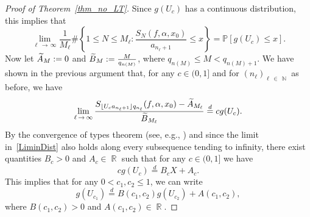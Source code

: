 \documentclass[10pt,a4paper]{amsart}
\numberwithin{equation}{section}
\DeclareMathOperator{\R}{\mathbb{R}}
\DeclareMathOperator{\N}{\mathbb{N}}
\newcommand{\bbP}{\mathbb{P}}
\let\oldtilde\tilde
\renewcommand*{\tilde}[1]{\mathchoice{\widetilde{#1}}{\widetilde{#1}}{\oldtilde{#1}}{\oldtilde{#1}}}
\theoremstyle{definition}
\begin{document}
\begin{proof}[Proof of Theorem~\ref{thm_no_LT}]
Since $g(U_c)$ has a continuous distribution, this implies that
\[
\lim_{\ell\,\rightarrow\,\infty} \frac{1}{M_{\ell}} \# \left \{ 1 \leq N \leq M_{\ell} : \frac{S_N(f, \alpha, x_0)}{a_{n_{\ell}+1}} \leq x \right \} = \bbP \left [g(U_c) \leq x \right].
\]
Now let $ \tilde{A}_M := 0$ and $\tilde{B}_M := \frac{M}{q_{n(M)}}$, where $q_{n(M)} \leq M < q_{n(M) +1}$. We have shown in the previous argument that, for any $c \in (0,1]$ and for $ (n_\ell)_{\ell\,\in\,\N}$ as before, we have
\begin{equation*}
\lim_{\ell\,\to\,\infty} \frac{S_{ \lfloor U_c a_{n_{\ell}+1} \rfloor q_{n_{\ell}} }(f, \alpha, x_0) - \tilde{A}_{M_\ell} }{\tilde{B}_{M_\ell}} \stackrel{d}{=} c g(U_c).
\end{equation*}
By the convergence of types theorem (see, e.g., \cite[Theorem~14.2]{billingsley}) and since the limit in~\eqref{LiminDist} also holds along every subsequence tending to infinity, there exist quantities $B_c > 0$ and $A_c \in \R$ such that for any $c \in (0,1]$ we have
\begin{equation*}
c g(U_c) \stackrel{d}{=} B_c X + A_c.
\end{equation*}
This implies that for any $0 < c_1, c_2 \leq 1$, we can write
\begin{equation}\label{EqEqinDist}
g(U_{c_1}) \stackrel{d}{=} B(c_1, c_2) g(U_{c_2}) + A(c_1, c_2),
\end{equation}
where $B(c_1, c_2) > 0$ and $A(c_1, c_2) \in \R$.


\end{proof}
\end{document}

